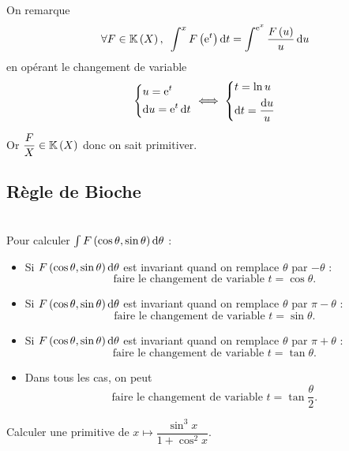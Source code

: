 \begin{prop}
On remarque \[\quantifs{\forall F\in\fracrat}\int^xF\paren{\e{t}}\odif{t}=\int^{\e{x}}\dfrac{F\paren{u}}{u}\odif{u}\] en opérant le changement de variable \[\begin{dcases}u=\e{t} \\ \odif{u}=\e{t}\odif{t}\end{dcases}\ssi\begin{dcases}t=\ln u \\ \odif{t}=\dfrac{\odif{u}}{u}\end{dcases}\]

Or \(\dfrac{F}{X}\in\fracrat\) donc on sait primitiver.
\end{prop}

\subsection{Règle de Bioche}

\begin{meth}~\\
Pour calculer \(\int F\paren{\cos\theta,\sin\theta}\odif{\theta}\) :

\begin{itemize}
\item Si \(F\paren{\cos\theta,\sin\theta}\odif{\theta}\) est invariant quand on remplace \(\theta\) par \(-\theta\) : \[\text{faire le changement de variable }t=\cos\theta.\]

\item Si \(F\paren{\cos\theta,\sin\theta}\odif{\theta}\) est invariant quand on remplace \(\theta\) par \(\pi-\theta\) : \[\text{faire le changement de variable }t=\sin\theta.\]

\item Si \(F\paren{\cos\theta,\sin\theta}\odif{\theta}\) est invariant quand on remplace \(\theta\) par \(\pi+\theta\) : \[\text{faire le changement de variable }t=\tan\theta.\]

\item Dans tous les cas, on peut \[\text{faire le changement de variable }t=\tan\dfrac{\theta}{2}.\]
\end{itemize}
\end{meth}

\begin{exoex}
Calculer une primitive de \(x\mapsto\dfrac{\sin^3x}{1+\cos^2x}\).
\end{exoex}

